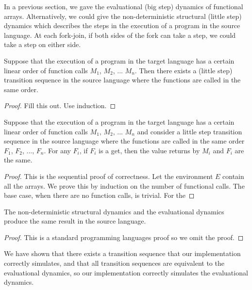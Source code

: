 \documentclass[preprint]{sigplanconf}
\begin{document}
In a previous section, we gave the evaluational (big step) dynamics of functional arrays. Alternatively, we could give the non-deterministic structural (little step) dynamics which describes the steps in the execution of a program in the source language. At each fork-join, if both sides of the fork can take a step, we could take a step on either side.

\begin{theorem}
Suppose that the execution of a program in the target language has a certain linear order of function calls $M_1$, $M_2$, ... $M_n$. Then there exists a (little step) transition sequence in the source language where the functions are called in the same order.
\end{theorem}

\begin{proof}
Fill this out. Use induction.
\end{proof}

\begin{theorem}
Suppose that the execution of a program in the target language has a certain linear order of function calls $M_1$, $M_2$, ... $M_n$ and consider a little step transition sequence in the source language where the functions are called in the same order $F_1$, $F_2$, ..., $F_n$. For any $F_i$, if $F_i$ is a get, then the value returns by $M_i$ and $F_i$ are the same.
\end{theorem}

\begin{proof}
This is the sequential proof of correctness.  
Let the environment $E$ contain all the arrays. 
We prove this by induction on the number of functional calls.
The base case, when there are no function calls, is trivial.
For the 
\end{proof}

\begin{theorem}
The non-deterministic structural dynamics and the evaluational dynamics produce the same result in the source language.
\end{theorem}

\begin{proof}
This is a standard programming languages proof so we omit the proof.
\end{proof}

We have shown that there exists a transition sequence that our implementation correctly simulates, and that all transition sequences are equivalent to the evaluational dynamics, so our implementation correctly simulates the evaluational dynamics.
\end{document}
